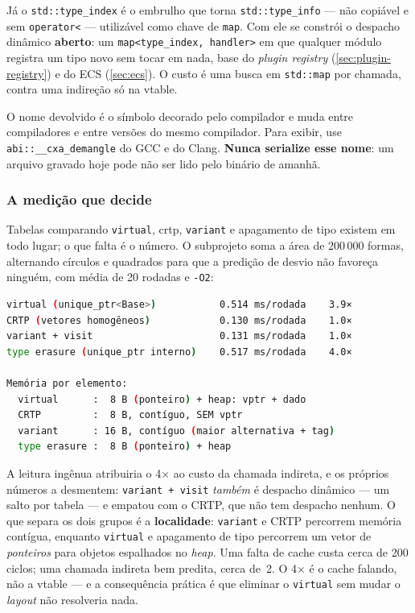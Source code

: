 Já o \texttt{std::type\_index} é o embrulho que torna \texttt{std::type\_info}
--- não copiável e sem \texttt{operator<} --- utilizável como chave de
\texttt{map}. Com ele se constrói o despacho dinâmico \textbf{aberto}: um
\texttt{map<type\_index, handler>} em que qualquer módulo registra um tipo novo
sem tocar em nada, base do \emph{plugin registry}
(\cref{sec:plugin-registry}) e do ECS (\cref{sec:ecs}). O custo é uma busca em
\texttt{std::map} por chamada, contra uma indireção só na vtable.

\begin{armadilha}
O nome devolvido é o símbolo decorado pelo compilador e muda entre compiladores
e entre versões do mesmo compilador. Para exibir, use
\texttt{abi::\_\_cxa\_demangle} do GCC e do Clang. \textbf{Nunca serialize esse
nome}: um arquivo gravado hoje pode não ser lido pelo binário de amanhã.
\end{armadilha}

\subsubsection{A medição que decide}
\label{sec:erasure-medicao}

Tabelas comparando \texttt{virtual}, \gls{crtp}, \texttt{variant} e apagamento
de tipo existem em todo lugar; o que falta é o número. O subprojeto soma a área
de 200\,000 formas, alternando círculos e quadrados para que a predição de
desvio não favoreça ninguém, com média de 20 rodadas e \texttt{-O2}:

\begin{lstlisting}[style=bt, language=bash,
    caption={Saída de \texttt{src/type\_erasure/}: 200\,000 elementos, 20
             rodadas, \texttt{-O2}.}]
virtual (unique_ptr<Base>)           0.514 ms/rodada    3.9×
CRTP (vetores homogêneos)            0.130 ms/rodada    1.0×
variant + visit                      0.131 ms/rodada    1.0×
type erasure (unique_ptr interno)    0.517 ms/rodada    4.0×

Memória por elemento:
  virtual      :  8 B (ponteiro) + heap: vptr + dado
  CRTP         :  8 B, contíguo, SEM vptr
  variant      : 16 B, contíguo (maior alternativa + tag)
  type erasure :  8 B (ponteiro) + heap
\end{lstlisting}

\begin{porque}
A leitura ingênua atribuiria o 4× ao custo da chamada indireta, e os próprios
números a desmentem: \texttt{variant + visit} \emph{também} é despacho dinâmico
--- um salto por tabela --- e empatou com o CRTP, que não tem despacho nenhum. O
que separa os dois grupos é a \textbf{localidade}: \texttt{variant} e CRTP
percorrem memória contígua, enquanto \texttt{virtual} e apagamento de tipo
percorrem um vetor de \emph{ponteiros} para objetos espalhados no \emph{heap}.
Uma falta de cache custa cerca de 200 ciclos; uma chamada indireta bem predita,
cerca de~2. O 4× é o cache falando, não a vtable --- e a consequência prática é
que eliminar o \texttt{virtual} sem mudar o \emph{layout} não resolveria nada.
\end{porque}

